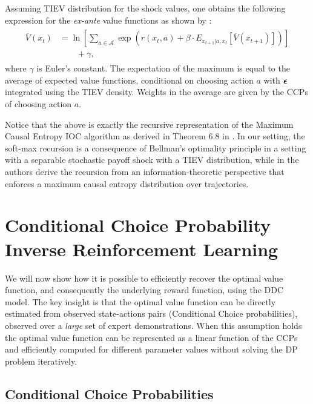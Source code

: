 \documentclass{article}
\renewcommand{\vec}[1]{\mbox{\bm{$#1$}}}
\begin{document}
Assuming TIEV distribution for the shock values, one obtains the following expression for the \emph{ex-ante} value functions as shown by \cite{rust_gmc}:
\begin{align} \label{eq:exanterust}
\begin{split}
\overline{V}(x_t) &=\ln\left[\sum_{a\in\mathcal{A}} \exp\left(r(x_t,a)+\beta \cdot E_{x_{t+1}|a,x_t} \left[ \overline{V}(x_{t+1}) \right] \right)\right] \\
& \qquad +\gamma,
\end{split}
\end{align}
where $\gamma$ is Euler's constant. The expectation of the maximum is equal to the average of expected value functions, conditional on choosing action $a$ with $\vec{\epsilon}$ integrated using the TIEV density. Weights in the average are given by the CCPs of choosing action $a$.


Notice that the above is exactly the recursive representation of the Maximum Causal Entropy IOC algorithm as derived in Theorem 6.8 in \cite{ziebart_phd}. In our setting, the soft-max recursion is a consequence of Bellman's optimality principle in a setting with a separable stochastic payoff shock with a TIEV distribution, while in \cite{ziebart_phd} the authors derive the recursion from an information-theoretic perspective that enforces a maximum causal entropy distribution over trajectories.

\section{Conditional Choice Probability Inverse Reinforcement Learning}

We will now show how it is possible to efficiently recover the optimal value function, and consequently the underlying reward function, using the DDC model. The key insight is that the optimal value function can be directly estimated from observed state-actions pairs (Conditional Choice probabilities), observed over a \textit{large} set of expert demonstrations. When this assumption holds the optimal value function can be represented as a linear function of the CCPs and efficiently computed for different parameter values without solving the DP problem iteratively.

\subsection{Conditional Choice Probabilities}
\end{document}
